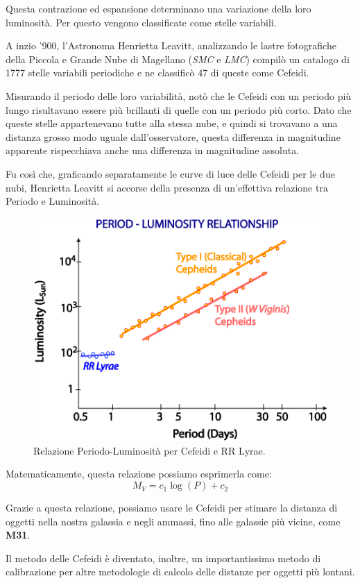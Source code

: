 \documentclass{article}
\begin{document}
Questa contrazione ed espansione determinano una variazione della
loro luminosità. Per questo vengono classificate come stelle
variabili.

A inzio '900, l'Astronoma Henrietta Leavitt, analizzando le lastre
fotografiche della Piccola e Grande Nube di Magellano (\emph{SMC} e
\emph{LMC}) compilò un catalogo di 1777 stelle variabili periodiche e
ne classificò 47 di queste come Cefeidi.

Misurando il periodo delle loro variabilità, notò che le Cefeidi con
un periodo più lungo risultavano essere più brillanti di quelle con un
periodo più corto. Dato che queste stelle appartenevano tutte alla
stessa nube, e quindi si trovavano a una distanza grosso modo uguale
dall'osservatore, questa differenza in magnitudine apparente
rispecchiava anche una differenza in magnitudine assoluta.

Fu così che, graficando separatamente le curve di luce delle Cefeidi
per le due nubi, Henrietta Leavitt si accorse della presenza di
un'effettiva relazione tra Periodo e Luminosità.

\begin{figure}[H]
  \centering
  \includegraphics[width=.5\textwidth]{plrelnceph}
  \caption{Relazione Periodo-Luminosità per Cefeidi e RR Lyrae.}
\end{figure}

Matematicamente, questa relazione possiamo esprimerla come:
\begin{equation}
  M_V = c_1 \log (P) + c_2
\end{equation}

Grazie a questa relazione, possiamo usare le Cefeidi per stimare la
distanza di oggetti nella nostra galassia e negli ammassi, fino alle
galassie più vicine, come \textbf{M31}.

Il metodo delle Cefeidi è diventato, inoltre, un importantissimo
metodo di calibrazione per altre metodologie di calcolo delle distanze
per oggetti più lontani.

\clearpage
\end{document}
